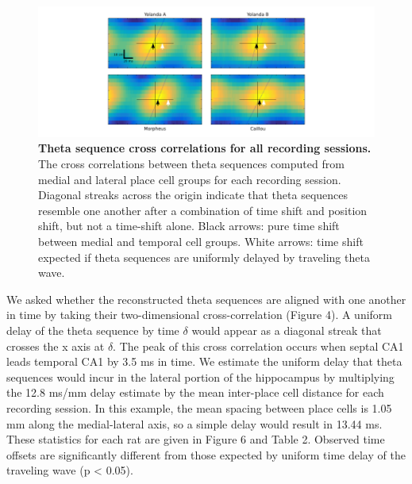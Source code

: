 \documentclass[]{article}
\begin{document}
\begin{figure}[htbp]
\centering
\includegraphics{./finalFigs/sequences_all.png}
\caption{\textbf{Theta sequence cross correlations for all recording sessions.}
The cross correlations between theta sequences computed from medial and
lateral place cell groups for each recording session. Diagonal streaks
across the origin indicate that theta sequences resemble one another
after a combination of time shift and position shift, but not a
time-shift alone. Black arrows: pure time shift between medial and
temporal cell groups. White arrows: time shift expected if theta
sequences are uniformly delayed by traveling theta wave.}
\end{figure}

We asked whether the reconstructed theta sequences are aligned with one
another in time by taking their two-dimensional cross-correlation
(Figure 4). A uniform delay of the theta sequence by time \(\delta\)
would appear as a diagonal streak that crosses the x axis at \(\delta\).
The peak of this cross correlation occurs when septal CA1 leads temporal
CA1 by 3.5 ms in time. We estimate the uniform delay that theta
sequences would incur in the lateral portion of the hippocampus by
multiplying the 12.8 ms/mm delay estimate by the mean inter-place cell
distance for each recording session. In this example, the mean spacing
between place cells is 1.05 mm along the medial-lateral axis, so a
simple delay would result in 13.44 ms. These statistics for each rat are
given in Figure 6 and Table 2. Observed time offsets are significantly
different from those expected by uniform time delay of the traveling
wave (p \textless{} 0.05).
\end{document}
